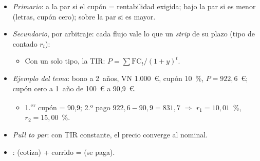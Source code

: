 \documentclass{article}
\begin{document}
\begin{columnas}
\begin{itemize}
\item \emph{Primario}: a la par si el cupón = rentabilidad exigida; bajo la par si es menor (letras, cupón cero); sobre la par si es mayor.
\item \emph{Secundario}, por arbitraje: cada flujo vale lo que un \emph{strip} de su plazo (tipo de contado $r_t$):
  \begin{itemize}
  \item Con un solo tipo, la TIR: $P=\sum\mathrm{FC}_t/(1+y)^t$.
  \end{itemize}
\item \emph{Ejemplo del tema}: bono a 2~años, VN 1.000~€, cupón 10~\%, $P=922{,}6$~€; cupón cero a 1~año de 100~€ a 90,9~€.
  \begin{itemize}
  \item 1.\textsuperscript{er} cupón = 90,9; 2.º pago $922{,}6-90{,}9=831{,}7$ $\Rightarrow$ $r_1=10{,}01$~\%, $r_2=15{,}00$~\%.
  \end{itemize}
\item \emph{Pull to par}: con TIR constante, el precio converge al nominal.
\item {}:  (cotiza) + corrido =  (se paga).
\end{itemize}


\end{columnas}
\end{document}
